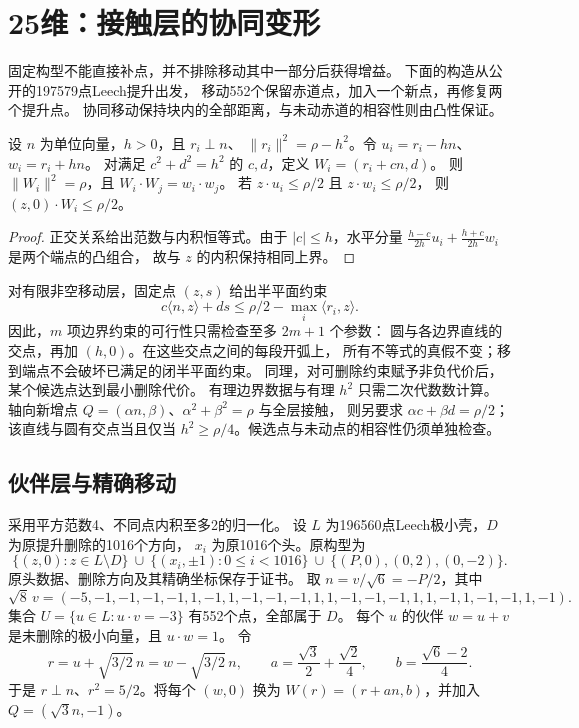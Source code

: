 \section{25维：接触层的协同变形}\label{sec:motion25}

固定构型不能直接补点，并不排除移动其中一部分后获得增益。
下面的构造从公开的197579点Leech提升出发\cite{kissingnumbers}，
移动552个保留赤道点，加入一个新点，再修复两个提升点。
协同移动保持块内的全部距离，与未动赤道的相容性则由凸性保证。

\begin{lemma}[沿弦的协同移动]\label{lem:chord-motion}
设 $n$ 为单位向量，$h>0$，且 $r_i\perp n$、
$\|r_i\|^2=\rho-h^2$。令 $u_i=r_i-hn$、$w_i=r_i+hn$。
对满足 $c^2+d^2=h^2$ 的 $c,d$，定义 $W_i=(r_i+cn,d)$。
则 $\|W_i\|^2=\rho$，且 $W_i\cdot W_j=w_i\cdot w_j$。
若 $z\cdot u_i\le\rho/2$ 且 $z\cdot w_i\le\rho/2$，
则 $(z,0)\cdot W_i\le\rho/2$。
\end{lemma}
\begin{proof}
正交关系给出范数与内积恒等式。由于 $|c|\le h$，水平分量
$\frac{h-c}{2h}u_i+\frac{h+c}{2h}w_i$ 是两个端点的凸组合，
故与 $z$ 的内积保持相同上界。
\end{proof}

对有限非空移动层，固定点 $(z,s)$ 给出半平面约束
\[
c\langle n,z\rangle+ds\le\rho/2-\max_i\langle r_i,z\rangle.
\]
因此，$m$ 项边界约束的可行性只需检查至多 $2m+1$ 个参数：
圆与各边界直线的交点，再加 $(h,0)$。在这些交点之间的每段开弧上，
所有不等式的真假不变；移到端点不会破坏已满足的闭半平面约束。
同理，对可删除约束赋予非负代价后，某个候选点达到最小删除代价。
有理边界数据与有理 $h^2$ 只需二次代数数计算。
轴向新增点 $Q=(\alpha n,\beta)$、$\alpha^2+\beta^2=\rho$ 与全层接触，
则另要求 $\alpha c+\beta d=\rho/2$；该直线与圆有交点当且仅当
$h^2\ge\rho/4$。候选点与未动点的相容性仍须单独检查。

\subsection{伙伴层与精确移动}
采用平方范数4、不同点内积至多2的归一化。
设 $L$ 为196560点Leech极小壳，$D$ 为原提升删除的1016个方向，
$x_i$ 为原1016个头。原构型为
\[
\{(z,0):z\in L\setminus D\}\ \cup\
\{(x_i,\pm1):0\le i<1016\}\ \cup\ \{(P,0),(0,2),(0,-2)\}.
\]
原头数据、删除方向及其精确坐标保存于证书。
取 $n=v/\sqrt6=-P/2$，其中
\[
\sqrt8\,v=(-5,-1,-1,-1,-1,1,-1,1,-1,-1,-1,1,
1,-1,-1,-1,1,1,-1,1,-1,-1,1,-1).
\]
集合 $U=\{u\in L:u\cdot v=-3\}$ 有552个点，全部属于 $D$。
每个 $u$ 的伙伴 $w=u+v$ 是未删除的极小向量，且 $u\cdot w=1$。
令
\[
r=u+\sqrt{3/2}\,n=w-\sqrt{3/2}\,n,\qquad
a=\frac{\sqrt3}{2}+\frac{\sqrt2}{4},\qquad b=\frac{\sqrt6-2}{4}.
\]
于是 $r\perp n$、$r^2=5/2$。将每个 $(w,0)$ 换为
$W(r)=(r+an,b)$，并加入 $Q=(\sqrt3n,-1)$。

